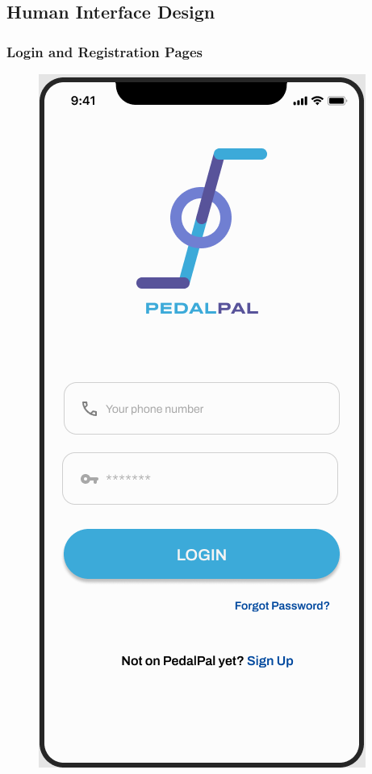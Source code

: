 \subsection{Human Interface Design}
\subsubsection{Login and Registration Pages}
\begin{figure}[h]
    \centering    
    \includegraphics[scale=0.35]{ui-images/Login.png}
    \hspace{30pt}

\end{figure}
